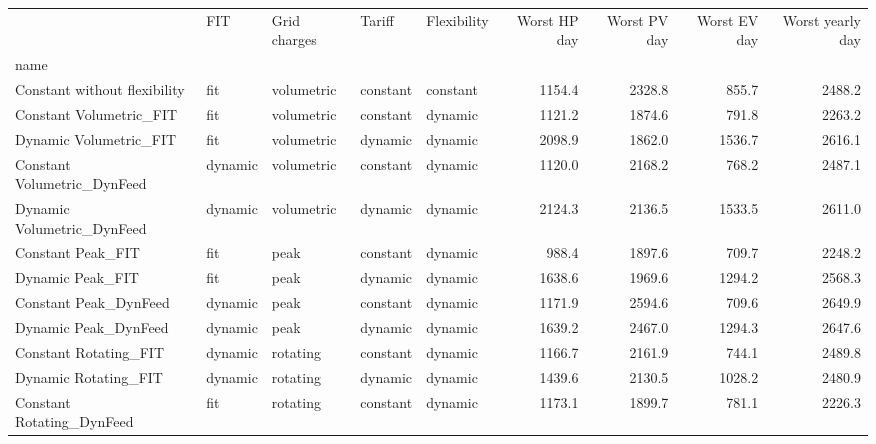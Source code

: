 \begin{tabular}{lllllrrrr}
\toprule
{} &      FIT & Grid charges &    Tariff & Flexibility &  Worst HP day &  Worst PV day &  Worst EV day &  Worst yearly day \\
name                         &          &              &           &             &               &               &               &                   \\
\midrule
Constant without flexibility &      fit &   volumetric &  constant &    constant &        1154.4 &        2328.8 &         855.7 &            2488.2 \\
Constant Volumetric\_FIT      &      fit &   volumetric &  constant &     dynamic &        1121.2 &        1874.6 &         791.8 &            2263.2 \\
Dynamic Volumetric\_FIT       &      fit &   volumetric &   dynamic &     dynamic &        2098.9 &        1862.0 &        1536.7 &            2616.1 \\
Constant Volumetric\_DynFeed  &  dynamic &   volumetric &  constant &     dynamic &        1120.0 &        2168.2 &         768.2 &            2487.1 \\
Dynamic Volumetric\_DynFeed   &  dynamic &   volumetric &   dynamic &     dynamic &        2124.3 &        2136.5 &        1533.5 &            2611.0 \\
Constant Peak\_FIT            &      fit &         peak &  constant &     dynamic &         988.4 &        1897.6 &         709.7 &            2248.2 \\
Dynamic Peak\_FIT             &      fit &         peak &   dynamic &     dynamic &        1638.6 &        1969.6 &        1294.2 &            2568.3 \\
Constant Peak\_DynFeed        &  dynamic &         peak &  constant &     dynamic &        1171.9 &        2594.6 &         709.6 &            2649.9 \\
Dynamic Peak\_DynFeed         &  dynamic &         peak &   dynamic &     dynamic &        1639.2 &        2467.0 &        1294.3 &            2647.6 \\
Constant Rotating\_FIT        &  dynamic &     rotating &  constant &     dynamic &        1166.7 &        2161.9 &         744.1 &            2489.8 \\
Dynamic Rotating\_FIT         &  dynamic &     rotating &   dynamic &     dynamic &        1439.6 &        2130.5 &        1028.2 &            2480.9 \\
Constant Rotating\_DynFeed    &      fit &     rotating &  constant &     dynamic &        1173.1 &        1899.7 &         781.1 &            2226.3 \\

\end{tabular}
